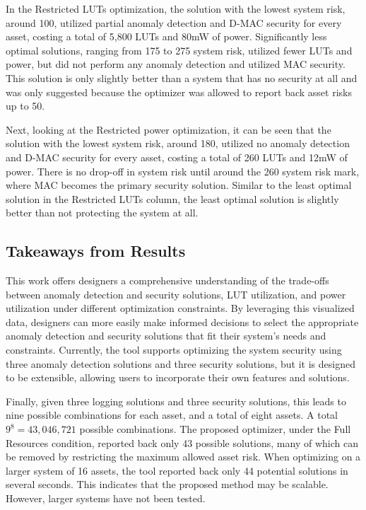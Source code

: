 In the Restricted LUTs optimization, the solution with the lowest system risk, around 100, utilized partial anomaly detection and D-MAC security for every asset, costing a total of 5,800 LUTs and 80mW of power. Significantly less optimal solutions, ranging from 175 to 275 system risk, utilized fewer LUTs and power, but did not perform any anomaly detection and utilized MAC security. This solution is only slightly better than a system that has no security at all and was only suggested because the optimizer was allowed to report back asset risks up to 50.

Next, looking at the Restricted power optimization, it can be seen that the solution with the lowest system risk, around 180, utilized no anomaly detection and D-MAC security for every asset, costing a total of 260 LUTs and 12mW of power. There is no drop-off in system risk until around the 260 system risk mark, where MAC becomes the primary security solution. Similar to the least optimal solution in the Restricted LUTs column, the least optimal solution is slightly better than not protecting the system at all. 







\subsection{Takeaways from Results}

This work offers designers a comprehensive understanding of the trade-offs between anomaly detection and security solutions, LUT utilization, and power utilization under different optimization constraints. By leveraging this visualized data, designers can more easily make informed decisions to select the appropriate anomaly detection and security solutions that fit their system's needs and constraints. Currently, the tool supports optimizing the system security using three anomaly detection solutions and three security solutions, but it is designed to be extensible, allowing users to incorporate their own features and solutions. %

Finally, given three logging solutions and three security solutions, this leads to nine possible combinations for each asset, and a total of eight assets. A total \(9^8=43,046,721\) possible combinations. The proposed optimizer, under the Full Resources condition, reported back only 43 possible solutions, many of which can be removed by restricting the maximum allowed asset risk. When optimizing on a larger system of 16 assets, the tool reported back only 44 potential solutions in several seconds. This indicates that the proposed method may be scalable. However, larger systems have not been tested.

 


